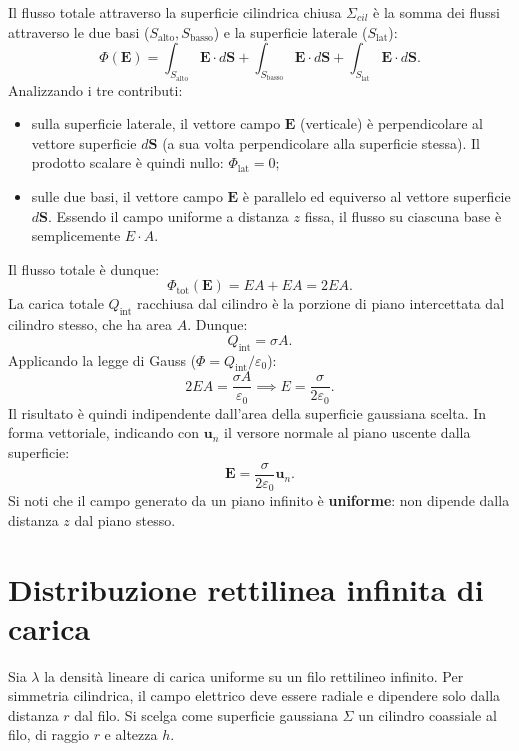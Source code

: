 \documentclass[a4paper,11pt]{report}
\begin{document}
Il flusso totale attraverso la superficie cilindrica chiusa $\Sigma_{cil}$ è la somma dei flussi attraverso le due basi ($S_{\text{alto}}, S_{\text{basso}}$) e la superficie laterale ($S_{\text{lat}}$):
\begin{equation}
    \Phi(\bm{E}) = \int_{S_{\text{alto}}} \bm{E} \cdot d\bm{S} + \int_{S_{\text{basso}}} \bm{E} \cdot d\bm{S} + \int_{S_{\text{lat}}} \bm{E} \cdot d\bm{S}.
\end{equation}
Analizzando i tre contributi:
\begin{itemize}
    \item sulla {superficie laterale}, il vettore campo $\bm{E}$ (verticale) è perpendicolare al vettore superficie $d\bm{S}$ (a sua volta perpendicolare alla superficie stessa). Il prodotto scalare è quindi nullo: $\Phi_{\text{lat}} = 0$;
    \item sulle {due basi}, il vettore campo $\bm{E}$ è parallelo ed equiverso al vettore superficie $d\bm{S}$. Essendo il campo uniforme a distanza $z$ fissa, il flusso su ciascuna base è semplicemente $E \cdot A$.
\end{itemize}
Il flusso totale è dunque:
\begin{equation}
    \Phi_{\text{tot}}(\bm{E}) = EA + EA = 2EA.
\end{equation}
La carica totale $Q_{\text{int}}$ racchiusa dal cilindro è la porzione di piano intercettata dal cilindro stesso, che ha area $A$. Dunque:
\begin{equation}
    Q_{\text{int}} = \sigma A.
\end{equation}
Applicando la legge di Gauss ($\Phi = Q_{\text{int}}/\varepsilon_0$):
\begin{equation}
    2EA = \frac{\sigma A}{\varepsilon_0} \implies  
    E = \frac{\sigma}{2\varepsilon_0}.
    \label{eq:campo_piano_scalare}
\end{equation}
Il risultato è quindi indipendente dall'area della superficie gaussiana scelta. In forma vettoriale, indicando con $\bm{u}_n$ il versore normale al piano uscente dalla superficie:
\begin{equation}
    {\bm{E} = \frac{\sigma}{2\varepsilon_0} \bm{u}_n}.
    \label{eq:campo_piano}
\end{equation}
Si noti che il campo generato da un piano infinito è \textbf{uniforme}: non dipende dalla distanza $z$ dal piano stesso.


\section{Distribuzione rettilinea infinita di carica}
Sia \(\lambda\) la densità lineare di carica uniforme su un filo rettilineo infinito. 
Per simmetria cilindrica, il campo elettrico deve essere radiale e dipendere solo dalla distanza \(r\) dal filo.
Si scelga come superficie gaussiana \(\Sigma\) un cilindro coassiale al filo, di raggio \(r\) e altezza \(h\). 
\end{document}

